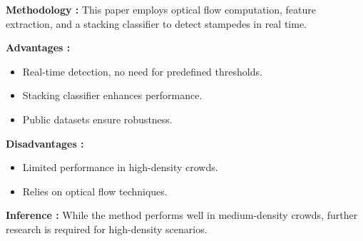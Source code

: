 \documentclass[11pt]{report}
\begin{document}
\textbf{Methodology :}  
This paper employs optical flow computation, feature extraction, and a stacking classifier to detect stampedes in real time.

\textbf{Advantages :}  
\begin{itemize}
    \item Real-time detection, no need for predefined thresholds.  
    \item Stacking classifier enhances performance.  
    \item Public datasets ensure robustness.
\end{itemize}

\textbf{Disadvantages : }  
\begin{itemize}
    \item Limited performance in high-density crowds.  
    \item Relies on optical flow techniques.
\end{itemize}

\textbf{Inference : }  
While the method performs well in medium-density crowds, further research is required for high-density scenarios.
\end{document}
